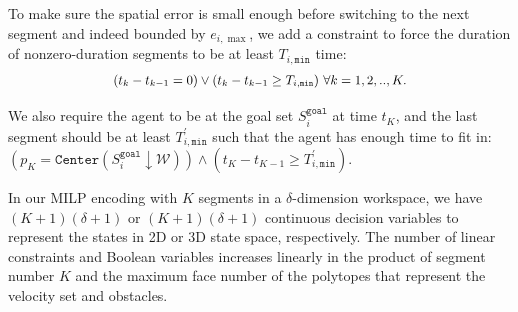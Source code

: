\documentclass[letterpaper]{article} %
\theoremstyle{definition}
\begin{document}
To make sure the spatial error is small enough before switching to the next segment and indeed bounded by $e_{i,\max}$, we add a constraint to force the duration of nonzero-duration segments to be at least $T_{i,\texttt{min}}$ time:
\begin{equation*}\small
    \begin{aligned}
    (t_k - t_{k-1} = 0) \lor
    (t_k - t_{k-1} \geq T_{i,\texttt{min}}) \ \forall k = 1,2,..,K.
    \end{aligned}
\end{equation*}


We also require the agent to be at the goal set $S^\texttt{goal}_i$ at time $t_K$, and the last segment should be at least $T_{i,\texttt{min}}^\prime$ such that the agent has enough time to fit in: 
{\small
     $(p_K = \texttt{Center}(S^\texttt{goal}_i \downarrow \mathcal{W})) \land (t_K - t_{K-1} \geq T_{i,\texttt{min}}^\prime)$.
}

In our MILP encoding with $K$ segments in a $\delta$-dimension workspace, we have $(K+1)(\delta+1)$ or $(K+1)(\delta+1)$ continuous decision variables to represent the states in 2D or 3D state space, respectively. The number of linear constraints and Boolean variables increases linearly in the product of segment number $K$ and the maximum face number of the polytopes that represent the velocity set and obstacles.

\end{document}
